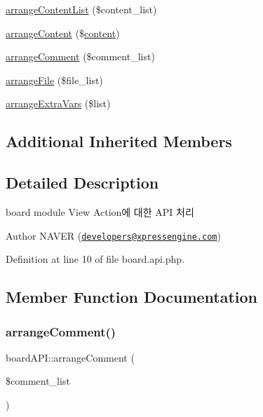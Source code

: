 \begin{DoxyCompactItemize}
\hyperlink{classboardAPI_ade487a5bde6abbc987dbe44f8adf8c22}{arrange\+Content\+List} (\$content\+\_\+list)
\item 
\hyperlink{classboardAPI_a8c3e9522bfba03480917fd7485de99c9}{arrange\+Content} (\$\hyperlink{classcontent}{content})
\item 
\hyperlink{classboardAPI_abf7fe7b5aef6dc0eb6d99cfb96eb5ad1}{arrange\+Comment} (\$comment\+\_\+list)
\item 
\hyperlink{classboardAPI_a01e0faec8a6509f75271f226c9be5004}{arrange\+File} (\$file\+\_\+list)
\item 
\hyperlink{classboardAPI_a80b7a5fb897ce7a42ff20c05f36b6522}{arrange\+Extra\+Vars} (\$list)
\end{DoxyCompactItemize}
\subsection*{Additional Inherited Members}


\subsection{Detailed Description}
board module View Action에 대한 A\+PI 처리 

\begin{DoxyAuthor}{Author}
N\+A\+V\+ER (\href{mailto:developers@xpressengine.com}{\tt developers@xpressengine.\+com}) 
\end{DoxyAuthor}


Definition at line 10 of file board.\+api.\+php.



\subsection{Member Function Documentation}
\mbox{\label{classboardAPI_abf7fe7b5aef6dc0eb6d99cfb96eb5ad1}} 
\subsubsection{\texorpdfstring{arrange\+Comment()}{arrangeComment()}}
{\footnotesize\ttfamily board\+A\+P\+I\+::arrange\+Comment (\begin{DoxyParamCaption}\item[{}]{\$comment\+\_\+list }\end{DoxyParamCaption})}



